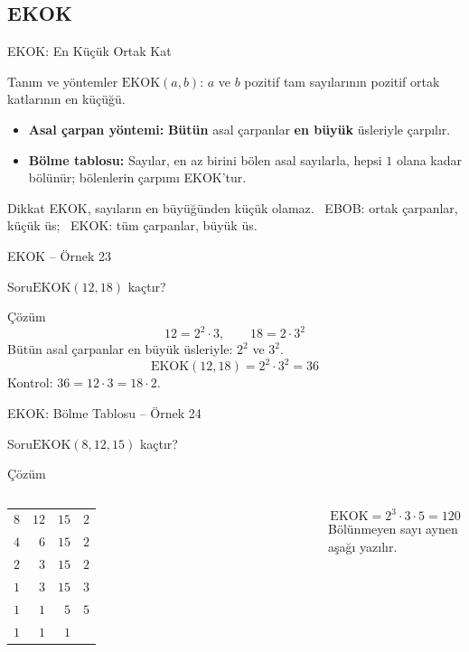 \documentclass[aspectratio=169,11pt,handout]{beamer}
\newcommand{\soru}[3]{%
\begin{frame}{#1}
  \begin{block}{Soru}\large #2\end{block}
  \pause
  \begin{exampleblock}{Çözüm}\large #3\end{exampleblock}
\end{frame}}
\begin{document}
\subsection{EKOK}
\begin{frame}{EKOK: En Küçük Ortak Kat}
\begin{block}{Tanım ve yöntemler}
\(\text{EKOK}(a,b)\): \(a\) ve \(b\) pozitif tam sayılarının pozitif ortak katlarının en küçüğü.
\begin{itemize}
\item \textbf{Asal çarpan yöntemi:} \textbf{Bütün} asal çarpanlar \textbf{en büyük} üsleriyle çarpılır.
\item \textbf{Bölme tablosu:} Sayılar, en az birini bölen asal sayılarla, hepsi \(1\) olana kadar bölünür; bölenlerin çarpımı EKOK'tur.
\end{itemize}
\end{block}
\begin{alertblock}{Dikkat}
EKOK, sayıların en büyüğünden küçük olamaz. \ EBOB: ortak çarpanlar, küçük üs; \ EKOK: tüm çarpanlar, büyük üs.
\end{alertblock}
\end{frame}

\soru{EKOK -- Örnek 23}
{\(\text{EKOK}(12,18)\) kaçtır?}
{\[12=2^2\cdot 3,\qquad 18=2\cdot 3^2\]
Bütün asal çarpanlar en büyük üsleriyle: \(2^2\) ve \(3^2\).
\[\text{EKOK}(12,18)=2^2\cdot 3^2=36\]
Kontrol: \(36=12\cdot 3=18\cdot 2\).}

\soru{EKOK: Bölme Tablosu -- Örnek 24}
{\(\text{EKOK}(8,12,15)\) kaçtır?}
{\begin{columns}[c]
\column{0.45\textwidth}
{\normalsize
\begin{tabular}{rrr|l}
\(8\) & \(12\) & \(15\) & \(2\)\\
\(4\) & \(6\) & \(15\) & \(2\)\\
\(2\) & \(3\) & \(15\) & \(2\)\\
\(1\) & \(3\) & \(15\) & \(3\)\\
\(1\) & \(1\) & \(5\) & \(5\)\\
\(1\) & \(1\) & \(1\) &
\end{tabular}}
\column{0.5\textwidth}
\[\text{EKOK}=2^3\cdot 3\cdot 5=120\]
Bölünmeyen sayı aynen aşağı yazılır.
\end{columns}}
\end{document}
